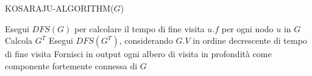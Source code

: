 \begin{algorithm}[H]
    \caption{KOSARAJU-ALGORITHM($G$)}\label{alg:cap2}
    \begin{algorithmic}[1]
        \State Esegui $DFS(G)$ per calcolare il tempo di fine visita $u.f$ per ogni nodo $u$ in $G$
        \State Calcola $G^T$
        \State Esegui $DFS(G^T)$, considerando $G.V$ in ordine decrescente di tempo di fine visita
        \State Fornisci in output ogni albero di visita in profondit\`a come componente fortemente connessa di $G$
    \end{algorithmic}
\end{algorithm}